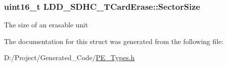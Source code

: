 \subsubsection[{Sector\+Size}]{\setlength{\rightskip}{0pt plus 5cm}uint16\+\_\+t L\+D\+D\+\_\+\+S\+D\+H\+C\+\_\+\+T\+Card\+Erase\+::\+Sector\+Size}\label{struct_l_d_d___s_d_h_c___t_card_erase_a3c0c33e89b65f4f6bfd6043585df5486}
The size of an erasable unit 

The documentation for this struct was generated from the following file\+:\begin{DoxyCompactItemize}
\item 
D\+:/\+Project/\+Generated\+\_\+\+Code/\hyperlink{_p_e___types_8h}{P\+E\+\_\+\+Types.\+h}\end{DoxyCompactItemize}
